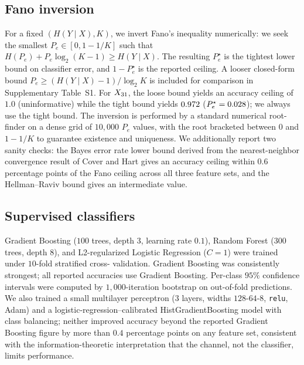 \documentclass[11pt,a4paper]{article}
\begin{document}
\subsection*{Fano inversion}

For a fixed $(H(Y \mid X), K)$, we invert Fano's inequality
numerically: we seek the smallest $P_e \in [0, 1 - 1/K]$ such that
$H(P_e) + P_e \log_2(K - 1) \geq H(Y \mid X)$. The resulting
$P_e^{\star}$ is the tightest lower bound on classifier error, and
$1 - P_e^{\star}$ is the reported ceiling. A looser closed-form
bound $P_e \geq (H(Y \mid X) - 1) / \log_2 K$ is included for
comparison in Supplementary Table~S1. %
For $X_{31}$, the loose bound
yields an accuracy ceiling of $1.0$ (uninformative) while the tight
bound yields $0.972$ ($P_e^\star = 0.028$); we always use the tight
bound. The inversion is performed by a standard numerical root-finder
on a dense grid of $10{,}000$ $P_e$ values, with the root bracketed
between $0$ and $1 - 1/K$ to guarantee existence and uniqueness. We
additionally report two sanity checks: the Bayes error rate lower bound
derived from the nearest-neighbor convergence result of Cover and
Hart\cite{cover2006} gives an accuracy ceiling within $0.6$ percentage
points of the Fano ceiling across all three feature sets, and the
Hellman--Raviv bound\cite{cover2006} gives an intermediate value.

\subsection*{Supervised classifiers}

Gradient Boosting ($100$ trees, depth $3$, learning rate $0.1$),
Random Forest ($300$ trees, depth $8$), and L2-regularized Logistic
Regression ($C = 1$) were trained under $10$-fold stratified cross-
validation. Gradient Boosting was consistently strongest; all reported
accuracies use Gradient Boosting. Per-class $95\%$ confidence intervals
were computed by $1{,}000$-iteration bootstrap\cite{efron1979bootstrap}
on out-of-fold predictions. We also trained a small multilayer
perceptron ($3$ layers, widths $128$-$64$-$8$, \texttt{relu}, Adam) and a
logistic-regression--calibrated HistGradientBoosting model with class
balancing; neither improved accuracy beyond the reported Gradient
Boosting figure by more than $0.4$ percentage points on any feature set,
consistent with the information-theoretic interpretation that the
channel, not the classifier, limits performance.
\end{document}
